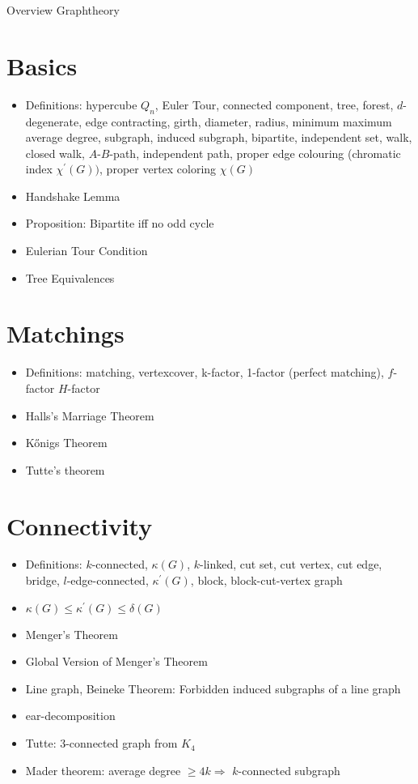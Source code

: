 \documentclass[a4paper]{article}
\title{}
\author{Klaus Philipp Theyssen}
\begin{document}
\begin{center}
    \Large Overview Graphtheory       
\end{center}

\section{Basics}    
\begin{itemize}
    \item Definitions: hypercube $ Q_n$, Euler Tour, connected component, 
    tree, forest, $d$-degenerate, edge contracting, girth, diameter, radius,
    minimum maximum average degree, subgraph, induced subgraph, bipartite,
    independent set, walk, closed walk, $A$-$B$-path, independent path,
    proper edge colouring (chromatic index $ \chi^\prime(G))$,
    proper vertex coloring $ \chi(G)$

    \item Handshake Lemma
    \item Proposition: Bipartite iff no odd cycle 
    \item Eulerian Tour Condition
    \item Tree Equivalences
\end{itemize}


\section{Matchings}
\begin{itemize}
    \item Definitions: matching, vertexcover, k-factor, 1-factor 
    (perfect matching), $f$-factor $H$-factor

    \item Halls's Marriage Theorem
    \item K\H{o}nigs Theorem
    \item Tutte's theorem
\end{itemize}


\section{Connectivity}
\begin{itemize}
    \item Definitions: $k$-connected, $\kappa(G)$, $k$-linked, cut set, 
    cut vertex, cut edge, bridge, $l$-edge-connected, $\kappa^\prime(G)$,
    block, block-cut-vertex graph

    \item $\kappa(G) \leq \kappa^\prime(G) \leq \delta(G) $
    \item Menger's Theorem 
    \item Global Version of Menger's Theorem
    \item Line graph, Beineke Theorem: Forbidden induced subgraphs of a line graph
    \item ear-decomposition
    \item Tutte: 3-connected graph from $ K_4$
    \item Mader theorem: average degree $ \geq 4k \Rightarrow$ $k$-connected subgraph
\end{itemize}
\end{document}
